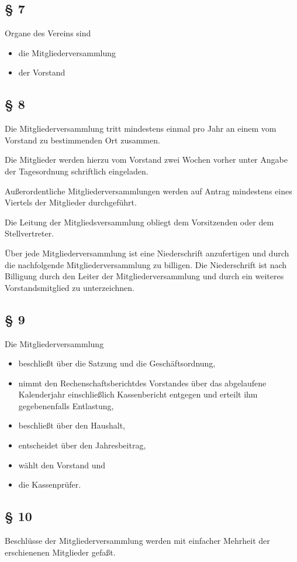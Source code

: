 \documentclass[11pt,a4paper]{article}
\begin{document}
\subsection*{§ 7}
Organe des Vereins sind
\begin{itemize}
\item die Mitgliederversammlung
\item der Vorstand
\end{itemize}
\subsection*{§ 8}
Die Mitgliederversammlung tritt mindestens einmal pro Jahr an einem vom
Vorstand zu bestimmenden Ort zusammen.

Die Mitglieder werden hierzu vom Vorstand zwei Wochen vorher unter Angabe der
Tagesordnung schriftlich eingeladen.

Außerordentliche Mitgliederversammlungen werden auf Antrag mindestens eines
Viertels der Mitglieder durchgeführt.

Die Leitung der Mitgliedsversammlung obliegt dem Vorsitzenden oder dem
Stellvertreter.

Über jede Mitgliederversammlung ist eine Niederschrift anzufertigen und durch
die nachfolgende Mitgliederversammlung zu billigen. Die Niederschrift ist
nach Billigung durch den Leiter der Mitgliederversammlung und durch ein
weiteres Vorstandsmitglied zu unterzeichnen.
\subsection*{§ 9}
Die Mitgliederversammlung
\begin{itemize}
\item beschließt über die Satzung und die Geschäftsordnung,
\item nimmt den Rechenschaftsberichtdes Vorstandes über das abgelaufene
  Kalenderjahr einschließlich Kassenbericht entgegen und erteilt ihm
  gegebenenfalls Entlastung,
\item beschließt über den Haushalt,
\item entscheidet über den Jahresbeitrag,
\item wählt den Vorstand und
\item die Kassenprüfer.
\end{itemize}
\subsection*{§ 10}
Beschlüsse der Mitgliederversammlung werden mit einfacher Mehrheit der
erschienenen Mitglieder gefaßt.
\end{document}
